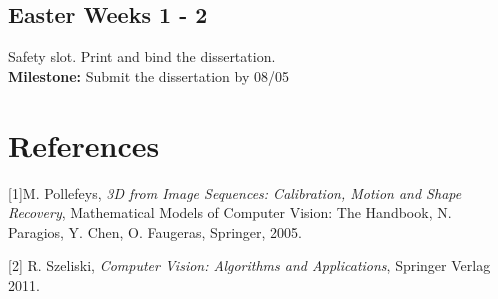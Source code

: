 \subsection*{Easter Weeks 1 - 2}  
Safety slot. Print and bind the dissertation.\\
{\bf Milestone:} Submit the dissertation by 08/05

\section*{References}

\begin{description}

\item{[1]}M. Pollefeys, \emph{3D from Image Sequences: Calibration, Motion and Shape Recovery}, Mathematical Models of Computer Vision: The Handbook, N. Paragios, Y. Chen, O. Faugeras, Springer, 2005.

\item{[2]} R. Szeliski, \emph{Computer Vision: Algorithms and Applications}, Springer Verlag 2011.
\end{description}

